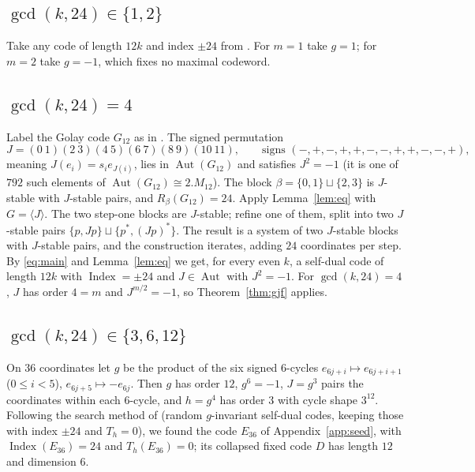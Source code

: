 \documentclass[11pt]{amsart}
\theoremstyle{definition}
\newcommand{\Index}{\operatorname{Index}}
\newcommand{\Aut}{\operatorname{Aut}}
\begin{document}
\subsection{\texorpdfstring{$\gcd(k,24)\in\{1,2\}$}{gcd(k,24) in \{1,2\}}}\label{sec:small}
Take any code of length $12k$ and index $\pm24$ from \cite{BR}. For $m=1$ take $g=1$; for $m=2$
take $g=-1$, which fixes no maximal codeword.

\subsection{\texorpdfstring{$\gcd(k,24)=4$}{gcd(k,24)=4}}\label{sec:J}
Label the Golay code $G_{12}$ as in \cite{BR}. The signed permutation
\[
J=(0\ 1)(2\ 3)(4\ 5)(6\ 7)(8\ 9)(10\ 11),\qquad
\text{signs }(-,+,-,+,+,-,-,+,+,-,-,+),
\]
meaning $J(e_i)=s_ie_{J(i)}$, lies in $\Aut(G_{12})$ and satisfies $J^2=-1$ (it is one of $792$
such elements of $\Aut(G_{12})\cong2.M_{12}$). The block $\beta=\{0,1\}\sqcup\{2,3\}$ is
$J$-stable with $J$-stable pairs, and $R_\beta(G_{12})=24$. Apply Lemma~\ref{lem:eq} with
$G=\langle J\rangle$. The two step-one blocks are $J$-stable; refine one of them, split into two
$J$-stable pairs $\{p,J p\}\sqcup\{p^*,(Jp)^*\}$. The result is a system of two $J$-stable blocks
with $J$-stable pairs, and the construction iterates, adding $24$ coordinates per step. By
\eqref{eq:main} and Lemma~\ref{lem:eq} we get, for every even $k$, a self-dual code of length
$12k$ with $\Index=\pm24$ and $J\in\Aut$ with $J^2=-1$. For $\gcd(k,24)=4$, $J$ has order
$4=m$ and $J^{m/2}=-1$, so Theorem~\ref{thm:gjf} applies.

\subsection{\texorpdfstring{$\gcd(k,24)\in\{3,6,12\}$}{gcd(k,24) in \{3,6,12\}}}\label{sec:z12}
On $36$ coordinates let $g$ be the product of the six signed $6$-cycles
$e_{6j+i}\mapsto e_{6j+i+1}$ ($0\le i<5$), $e_{6j+5}\mapsto-e_{6j}$. Then $g$ has order $12$,
$g^6=-1$, $J=g^3$ pairs the coordinates within each $6$-cycle, and $h=g^4$ has order $3$ with
cycle shape $3^{12}$. Following the search method of \cite{GJF} (random $g$-invariant self-dual
codes, keeping those with index $\pm24$ and $T_h=0$), we found the code $E_{36}$ of
Appendix~\ref{app:seed}, with $\Index(E_{36})=24$ and $T_h(E_{36})=0$; its collapsed fixed code
$D$ has length $12$ and dimension $6$.
\end{document}
